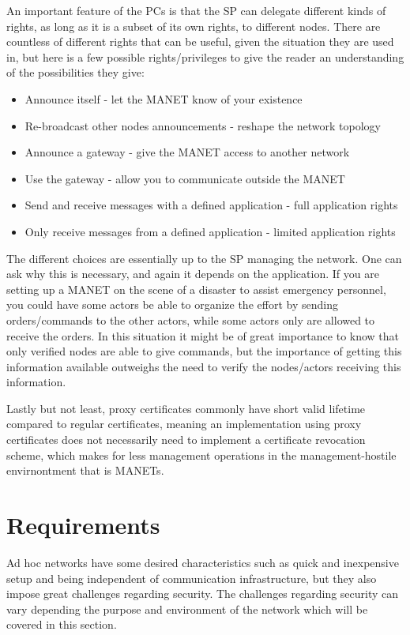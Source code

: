 An important feature of the \acp{PC} is that the \ac{SP} can delegate different
kinds of rights, as long as it is a subset of its own rights, to different
nodes. There are countless of different rights that can be useful, given the situation
they are used in, but here is a few possible rights/privileges to give the
reader an understanding of the possibilities they give:

\begin{itemize}
  \item Announce itself - let the \ac{MANET} know of your existence
  \item Re-broadcast other nodes announcements - reshape the network topology
  \item Announce a gateway - give the \ac{MANET} access to another network
  \item Use the gateway - allow you to communicate outside the \ac{MANET}
  \item Send and receive messages with a defined application - full application
  rights
  \item Only receive messages from a defined application - limited application
  rights
\end{itemize}

The different choices are essentially up to the \ac{SP} managing the network.
One can ask why this is necessary, and again it depends on the application. If
you are setting up a \ac{MANET} on the scene of a disaster to assist emergency
personnel, you could have some actors be able to organize the effort by sending
orders/commands to the other actors, while some actors only are allowed to
receive the orders. In this situation it might be of great importance to know
that only verified nodes are able to give commands, but the importance of
getting this information available outweighs the need to verify the nodes/actors
receiving this information.

Lastly but not least, proxy certificates commonly have short valid lifetime
compared to regular certificates, meaning an implementation using proxy
certificates does not necessarily need to implement a certificate revocation
scheme, which makes for less management operations in the management-hostile
envirnontment that is \acp{MANET}.


\section{Requirements}
Ad hoc networks have some desired characteristics such as quick and inexpensive
setup and being independent of communication infrastructure, but they also
impose great challenges regarding security. The challenges regarding security
can vary depending the purpose and environment of the network which will be
covered in this section.


